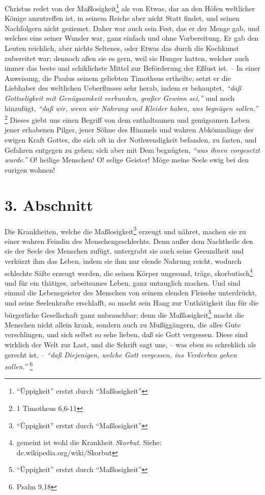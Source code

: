 \medskip

Christus redet von der Maßlosigkeit\footnote{"`Üppigkeit"' erstzt durch "`Maßlosigkeit"'} als von Etwas, dar an den Höfen weltlicher
Könige anzutreffen ist, in seinem Reiche aber nicht Statt findet, und seinen
Nachfolgern nicht geziemet. Daher war auch sein Fest, das er der Menge gab, und
welches eins seiner Wunder war, ganz einfach und ohne Vorbereitung. Er gab den
Leuten reichlich, aber nichts Seltenes, oder Etwas das durch die Kochkunst
zubereitet war; dennoch aßen sie es gern, weil sie Hunger hatten, welcher auch
immer das beste und schiklichste Mittel zur Beförderung der Eßlust ist. -- In
einer Anweisung, die Paulus seinem geliebten Timotheus ertheilte, setzt er die
Liebhaber des weltlichen Ueberflusses sehr herab, indem er behauptet,
\textit{"`daß Gottseligkeit mit Genügsamkeit verbunden, großer Gewinn sei,"'} und noch hinzufügt, \textit{"`daß wir, wenn wir Nahrung und Kleider haben, uns begnügen
sollen."'}
\footnote{1 Timotheus 6,6-11}
Dieses giebt uns einen Begriff von dem
enthaltsamen und genügsamen Leben jener erhabenen Pilger, jener Söhne des Himmels und wahren Abkömmlinge der ewigen Kraft Gottes, die sich oft in der
Nothwendigkeit befanden, zu fasten, und Gefahren entgegen zu gehen; sich aber
mit Dem begnügten, \textit{"`was ihnen vorgesetzt wurde."'} O! heilige Menschen! O!
selige Geister! Möge meine Seele ewig bei den eurigen wohnen!

\section{3. Abschnitt} \label{kap14_ab3}

Die Krankheiten, welche die Maßlosigkeit\footnote{"`Üppigkeit"' erstzt durch "`Maßlosigkeit"'} erzeugt und nähret, machen sie zu einer
wahren Feindin des Menschengeschlechts. Denn außer dem Nachtheile den sie der
Seele des Menschen zufügt, untergrabt sie auch seine Gesundheit und verkürzt ihm
das Leben, indem sie ihm nur elende Nahrung reicht, wodurch schlechte Säfte
erzeugt werden, die seinen Körper ungesund, träge, skorbutisch\footnote{gemeint ist
wohl die Krankheit \textit{Skorbut}. Siehe: de.wikipedia.org/wiki/Skorbut} und für ein thätiges,
arbeitsames Leben, ganz untauglich machen. Und sind einmal die Lebensgeister des
Menschen von seinem elenden Fleisehe unterdrückt, und seine Seelenkrafte
erschlafft, so macht sein Hang zur Unthätigkeit ihn für die bürgerliche Gesellschaft ganz unbrauchbar; denn die Maßlosigkeit\footnote{"`Üppigkeit"' erstzt durch "`Maßlosigkeit"'} macht die Menschen nicht
allein krank, sondern auch zu Mußiggängern, die alles Gute verschlingen, und
sich selbst so sehe lieben, daß sie Gott vergessen. Diese sind wirklich der Welt
zur Last, und die Schrift sagt uns, -- was eben so schreklich als gerecht ist,
-- \textit{"`daß Diejenigen, welche Gott vergessen, ins Verderben gehen
sollen."'}
\footnote{Psalm 9,18}

